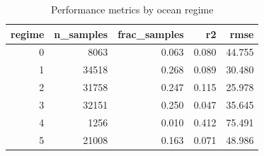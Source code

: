 \begin{table}
\caption{Performance metrics by ocean regime}
\label{tab:performance}
\begin{tabular}{rrrrr}
\toprule
regime & n_samples & frac_samples & r2 & rmse \\
\midrule
0 & 8063 & 0.063 & 0.080 & 44.755 \\
1 & 34518 & 0.268 & 0.089 & 30.480 \\
2 & 31758 & 0.247 & 0.115 & 25.978 \\
3 & 32151 & 0.250 & 0.047 & 35.645 \\
4 & 1256 & 0.010 & 0.412 & 75.491 \\
5 & 21008 & 0.163 & 0.071 & 48.986 \\
\bottomrule
\end{tabular}
\end{table}
